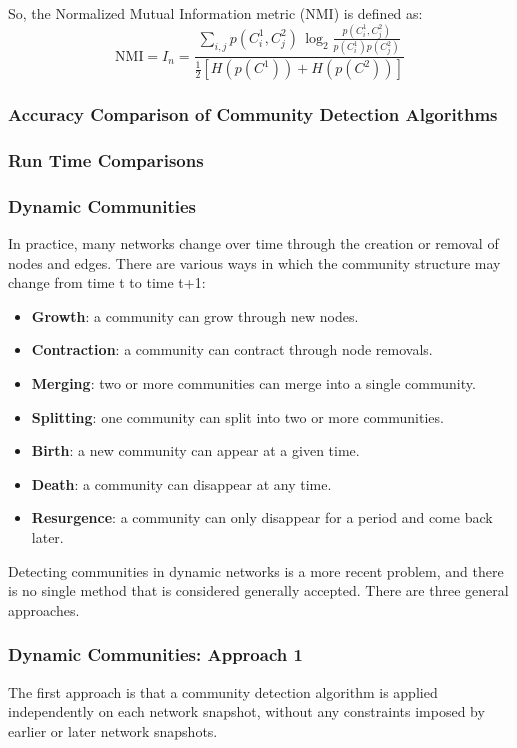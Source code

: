 \documentclass[11pt]{scrartcl} %
\begin{document}
So, the Normalized Mutual Information metric (NMI) is defined as:
\[ \mbox{NMI} = I_n = \frac{\sum_{i,j} p(C^1_i, C^2_j) \, \log_2 \frac{p(C^1_i, C^2_j) }{p(C^1_i) p(C^2_j)}} {\frac{1}{2} [H(p(C^1)) + H(p(C^2))]} \]

\subsubsection{Accuracy Comparison of Community Detection Algorithms}
\subsubsection{Run Time Comparisons}
\subsubsection{Dynamic Communities}
In practice, many networks change over time through the creation or removal of nodes and edges. There are various ways in which the community structure may change from time t to time t+1:
\begin{itemize}
	\item \textbf{Growth}: a community can grow through new nodes.
	\item \textbf{Contraction}: a community can contract through node removals.
	\item \textbf{Merging}: two or more communities can merge into a single community.
	\item \textbf{Splitting}: one community can split into two or more communities.
	\item \textbf{Birth}: a new community can appear at a given time.
	\item \textbf{Death}: a community can disappear at any time.
	\item \textbf{Resurgence}: a community can only disappear for a period and come back later.
\end{itemize}

Detecting communities in dynamic networks is a more recent problem, and there is no single method that is considered generally accepted. There are three general approaches.

\subsubsection{Dynamic Communities: Approach 1}
The first approach is that a community detection algorithm is applied independently on each network snapshot, without any constraints imposed by earlier or later network snapshots.
\end{document}

